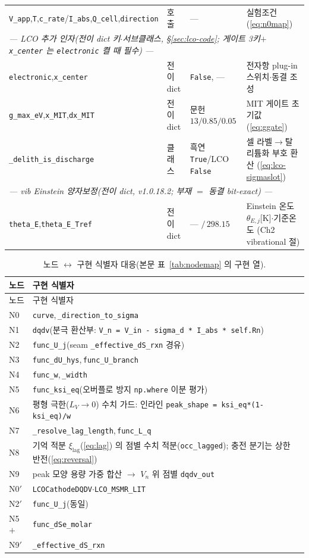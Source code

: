 \documentclass[11pt,a4paper]{article}
\newcommand{\code}[1]{\texttt{#1}}
\begin{document}
\begin{longtable}{l l l l}
\code{V\_app},\code{T},\code{c\_rate}/\code{I\_abs},\code{Q\_cell},\code{direction} & 호출 & --- & 실험조건 (\eqref{eq:n0map}) \\
\multicolumn{4}{l}{\emph{— LCO 추가 인자(전이 dict 키$\cdot$서브클래스, \S\ref{sec:lco-code}; 게이트 3키$+$\code{x\_center} 는 \code{electronic} 켤 때 필수) —}}\\
\code{electronic},\code{x\_center} & 전이 dict & \code{False}, — & 전자항 plug-in 스위치$\cdot$동결 조성 \\
\code{g\_max\_eV},\code{x\_MIT},\code{dx\_MIT} & 전이 dict & 문헌 $13/0.85/0.05$ & MIT 게이트 초기값 (\eqref{eq:ggate}) \\
\code{\_delith\_is\_discharge} & 클래스 & 흑연 \code{True}/LCO \code{False} & 셀 라벨$\to$탈리튬화 부호 환산 (\eqref{eq:lco-sigmaslot}) \\
\multicolumn{4}{l}{\emph{— vib Einstein 양자보정(전이 dict, v1.0.18.2; 부재 $=$ 동결 bit-exact) —}}\\
\code{theta\_E},\code{theta\_E\_Tref} & 전이 dict & --- $/\,298.15$ & Einstein 온도 $\theta_{E,j}$[K]$\cdot$기준온도 (Ch2 vibrational 절) \\
\bottomrule
\end{longtable}
\endgroup

\begingroup
\renewcommand{\arraystretch}{1.3}
\begin{longtable}{l p{}}
\caption{노드 $\leftrightarrow$ 구현 식별자 대응(본문 표~\ref{tab:nodemap} 의 구현 열).}\label{tab:nodecode}\\
\toprule
노드 & 구현 식별자 \\
\midrule
\endfirsthead
\toprule
노드 & 구현 식별자 \\
\midrule
\endhead
N0 & \code{curve},\,\code{\_direction\_to\_sigma} \\
N1 & \code{dqdv}(분극 환산부: \code{V\_n = V\_in - sigma\_d * I\_abs * self.Rn}) \\
N2 & \code{func\_U\_j}(seam \code{\_effective\_dS\_rxn} 경유) \\
N3 & \code{func\_dU\_hys},\,\code{func\_U\_branch} \\
N4 & \code{func\_w},\,\code{\_width} \\
N5 & \code{func\_ksi\_eq}(오버플로 방지 \code{np.where} 이분 평가) \\
N6 & 평형 극한($L_V\!\to\!0$) 수치 가드: 인라인 \code{peak\_shape = ksi\_eq*(1-ksi\_eq)/w} \\
N7 & \code{\_resolve\_lag\_length},\,\code{func\_L\_q} \\
N8 & 기억 적분 $\xi_\mathrm{lag}$(\eqref{eq:lag}) 의 점별 수치 적분(\code{occ\_lagged}); 충전 분기는 상한 반전(\eqref{eq:reversal}) \\
N9 & peak 모양 용량 가중 합산 $\to$ $V_n$ 위 점별 \code{dqdv\_out} \\
N0$'$ & \code{LCOCathodeDQDV}$\cdot$\code{LCO\_MSMR\_LIT} \\
N2$'$ & \code{func\_U\_j}(동일) \\
N5$+$ & \code{func\_dSe\_molar} \\
N9$'$ & \code{\_effective\_dS\_rxn} \\
\bottomrule
\end{longtable}
\endgroup
\end{document}
